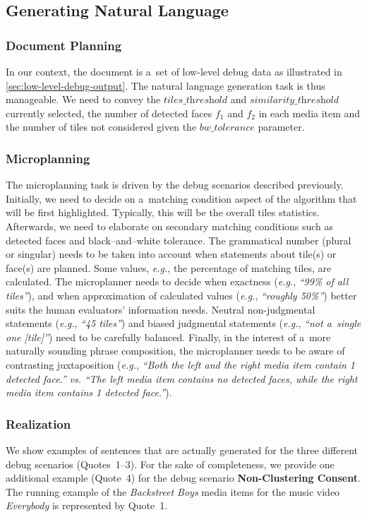 \documentclass{article}
\begin{document}
\subsection{Generating Natural Language}

\subsubsection{Document Planning}
In our context, the document is a~set of low-level debug data as illustrated in \autoref{sec:low-level-debug-output}. The natural language generation task is thus manageable. We need to convey the $\textit{tiles\_threshold}$ and $\textit{similarity\_threshold}$ currently selected, the number of detected faces $f_1$ and $f_2$ in each media item and the number of tiles not considered given the $\textit{bw\_tolerance}$ parameter.

\subsubsection{Microplanning}
The microplanning task is driven by the debug scenarios described previously. Initially, we need to decide on a~matching condition aspect of the algorithm that will be first highlighted. Typically, this will be the overall tiles statistics. Afterwards, we need to elaborate on secondary matching conditions such as detected faces and black--and--white tolerance. The grammatical number (plural or singular) needs to be taken into account when statements about tile(s) or face(s) are planned. Some values, \emph{e.g.}, the percentage of matching tiles, are calculated. The microplanner needs to decide when exactness (\emph{e.g.}, \textit{``99\% of all tiles''}), and when approximation of calculated values (\emph{e.g.}, \textit{``roughly 50\%''}) better suits the human evaluators' information needs. Neutral non-judgmental statements (\emph{e.g.}, \textit{``45 tiles''}) and biased judgmental statements (\emph{e.g.}, \textit{``not a~single one [tile]''}) need to be carefully balanced. Finally, in the interest of a~more naturally sounding phrase composition, the microplanner needs to be aware of contrasting juxtaposition (\emph{e.g.}, \textit{``Both the left and the right media item contain 1 detected face.''} \emph{vs.} \textit{``The left media item contains no detected faces, while the right media item contains 1 detected face.''}).

\subsubsection{Realization}
We show examples of sentences that are actually generated for the three different debug scenarios (Quotes~1--3). For the sake of completeness, we provide one additional example (Quote~4) for the debug scenario \textbf{Non-Clustering Consent}. The running example of the \emph{Backstreet Boys} media items for the music video \emph{Everybody} is represented by Quote~1.
\end{document}
